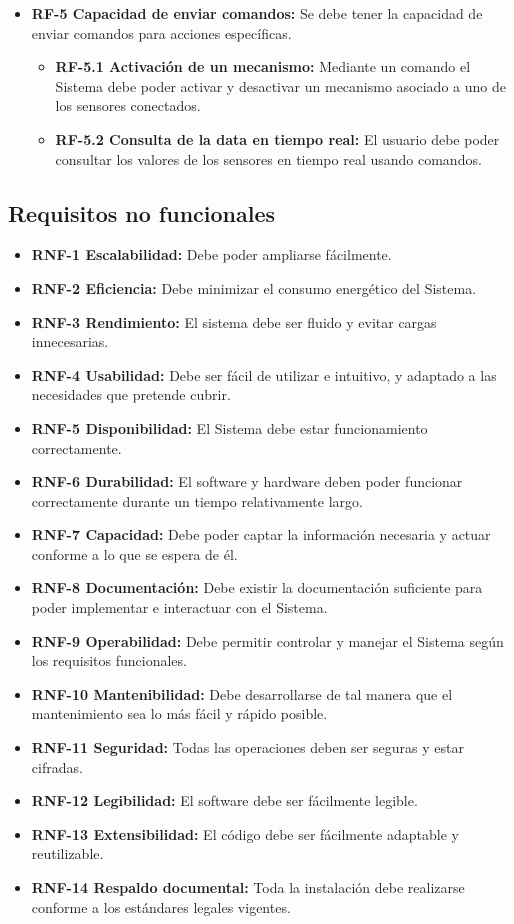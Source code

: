 \begin{itemize}
    \item \textbf{RF-5 Capacidad de enviar comandos:} Se debe tener la capacidad de enviar comandos para acciones específicas.
    \begin{itemize}
        \item \textbf{RF-5.1 Activación de un mecanismo:} Mediante un comando el Sistema debe poder activar y desactivar un mecanismo asociado a uno de los sensores conectados.
        \item \textbf{RF-5.2 Consulta de la data en tiempo real:} El usuario debe poder consultar los valores de los sensores en tiempo real usando comandos.
    \end{itemize}
\end{itemize}

\subsection{\textbf{Requisitos no funcionales}}

\begin{itemize}
    \item \textbf{RNF-1 Escalabilidad:} Debe poder ampliarse fácilmente.
    \item \textbf{RNF-2 Eficiencia:} Debe minimizar el consumo energético del Sistema.
    \item \textbf{RNF-3 Rendimiento:} El sistema debe ser fluido y evitar cargas innecesarias.
    \item \textbf{RNF-4 Usabilidad:} Debe ser fácil de utilizar e intuitivo, y adaptado a las necesidades que pretende cubrir.
    \item \textbf{RNF-5 Disponibilidad:} El Sistema debe estar funcionamiento correctamente.
    \item \textbf{RNF-6 Durabilidad:} El software y hardware deben poder funcionar correctamente durante un tiempo relativamente largo.
    \item \textbf{RNF-7 Capacidad:} Debe poder captar la información necesaria y actuar conforme a lo que se espera de él.
    \item \textbf{RNF-8 Documentación:} Debe existir la documentación suficiente para poder implementar e interactuar con el Sistema.
    \item \textbf{RNF-9 Operabilidad:} Debe permitir controlar y manejar el Sistema según los requisitos funcionales.
    \item \textbf{RNF-10 Mantenibilidad:} Debe desarrollarse de tal manera que el mantenimiento sea lo más fácil y rápido posible.
    \item \textbf{RNF-11 Seguridad:} Todas las operaciones deben ser seguras y estar cifradas.
    \item \textbf{RNF-12 Legibilidad:} El software debe ser fácilmente legible.
    \item \textbf{RNF-13 Extensibilidad:} El código debe ser fácilmente adaptable y reutilizable.
    \item \textbf{RNF-14 Respaldo documental:} Toda la instalación debe realizarse conforme a los estándares legales vigentes.
\end{itemize}


